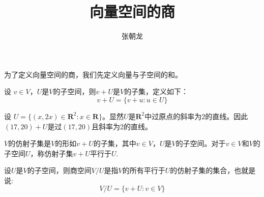\documentclass[10pt,a4paper,UTF8]{article}
\author{张朝龙}
\date{}
\title{向量空间的商}
\begin{document}
\maketitle
{}
为了定义向量空间的商，我们先定义向量与子空间的和。

\begin{definition}
设 \(v\in V\)，\(U\)是\(V\)的子空间，则\(v+U\)是\(V\)的子集，定义如下：
\[v+U = \{v + u:u\in U\}\]
\end{definition}

\begin{instance}
设 \(U = \{(x,2x)\in \mathbf{R}^{2}: x\in \mathbf{R}\}\)。显然\(U\)是\(\mathbf{R}^{2}\)中过原点的斜率为\(2\)的直线。因此\((17,20) + U\)是过\((17,20)\)且斜率为2的直线。
\end{instance}

\begin{definition}
\(V\)的仿射子集是\(V\)的形如\(v+U\)的子集，其中\(v\in V\)，\(U\)是\(V\)的子空间。对于\(v\in V\)和\(V\)的子空间\(U\)，称仿射子集\(v+U\)平行于\(U\).
\end{definition}

\begin{definition}
设\(U\)是\(V\)的子空间，则商空间\(V/U\)是指\(V\)的所有平行于\(U\)的仿射子集的集合，也就是说:\[V/U = \{v+ U:v\in V\}\]
\end{definition}
\end{document}
